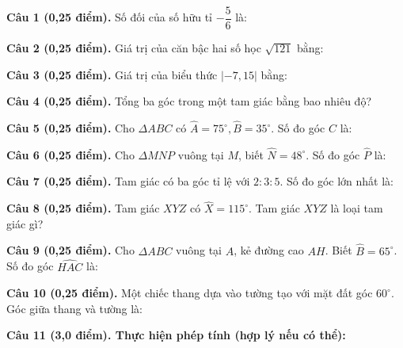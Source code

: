 \documentclass[12pt,a4paper]{article}
\begin{document}
\vspace{1.5mm}
\noindent\textbf{Câu 1 (0,25 điểm).} Số đối của số hữu tỉ $-\dfrac{5}{6}$ là: \par\vspace{2.3mm}
\noindent\textbf{Câu 2 (0,25 điểm).} Giá trị của căn bậc hai số học $\sqrt{121}$ bằng: \par\vspace{2.3mm}
\noindent\textbf{Câu 3 (0,25 điểm).} Giá trị của biểu thức $|-7{,}15|$ bằng: \par\vspace{2.3mm}
\noindent\textbf{Câu 4 (0,25 điểm).} Tổng ba góc trong một tam giác bằng bao nhiêu độ? \par\vspace{2.3mm}
\noindent\textbf{Câu 5 (0,25 điểm).} Cho $\Delta ABC$ có $\widehat{A} = 75^\circ, \widehat{B} = 35^\circ$. Số đo góc $\widehat{C}$ là: \par\vspace{2.3mm}
\noindent\textbf{Câu 6 (0,25 điểm).} Cho $\Delta MNP$ vuông tại $M$, biết $\widehat{N} = 48^\circ$. Số đo góc $\widehat{P}$ là: \par\vspace{2.3mm}
\noindent\textbf{Câu 7 (0,25 điểm).} Tam giác có ba góc tỉ lệ với $2 : 3 : 5$. Số đo góc lớn nhất là: \par\vspace{2.3mm}
\noindent\textbf{Câu 8 (0,25 điểm).} Tam giác $XYZ$ có $\widehat{X} = 115^\circ$. Tam giác $XYZ$ là loại tam giác gì? \par\vspace{2.3mm}
\noindent\textbf{Câu 9 (0,25 điểm).} Cho $\Delta ABC$ vuông tại $A$, kẻ đường cao $AH$. Biết $\widehat{B} = 65^\circ$. Số đo góc $\widehat{HAC}$ là: \par\vspace{2.3mm}
\noindent\textbf{Câu 10 (0,25 điểm).} Một chiếc thang dựa vào tường tạo với mặt đất góc $60^\circ$. Góc giữa thang và tường là: \par\vspace{2.3mm}
\vspace{0.2mm}
\noindent\textbf{Câu 11 (3,0 điểm). Thực hiện phép tính (hợp lý nếu có thể):}
\vspace{0.8mm}
\end{document}
